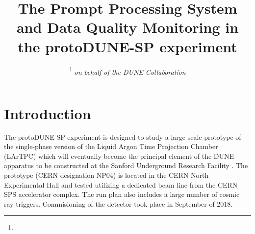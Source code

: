 \documentclass{webofc}
\newcommand{\pd}{protoDUNE\xspace}
\begin{document}
%
\title{The Prompt Processing System and Data Quality Monitoring in the \pd-SP experiment}
%
\author{ 
\fnsep\thanks{} \it{on behalf of the DUNE Collaboration}
}




%
\maketitle
%
\section{Introduction}
\label{sec:intro}
The \pd-SP experiment is designed to study a large-scale prototype of the single-phase version of
the Liquid Argon Time Projection Chamber (LArTPC) which will eventually become
the principal element of the DUNE apparatus to be constructed at the Sanford Underground
Research Facility \cite{cdrVol1, cdrVol4}. The prototype (CERN designation NP04) is located
in the CERN North Experimental Hall and tested utilizing a dedicated beam line from the CERN SPS
accelerator complex. The run plan also includes a large number of cosmic ray triggers.
Commisioning of the detector took place in September of 2018.
\end{document}
